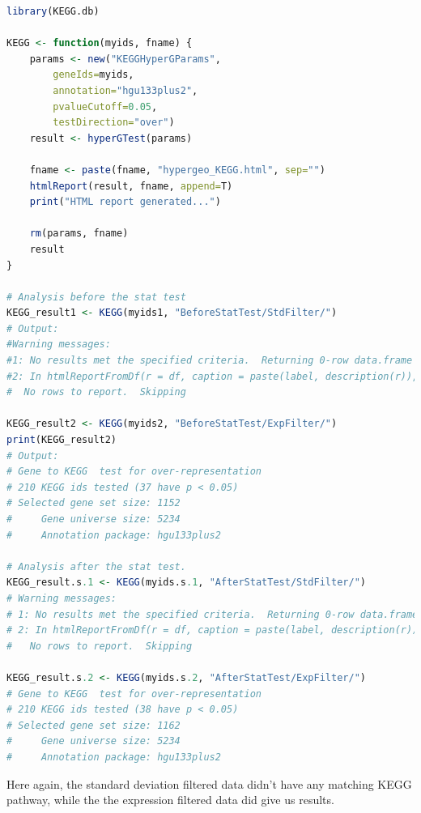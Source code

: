 \documentclass[oneside, a4paper, 11pt]{book}
\begin{document}
\begin{lstlisting}[language=R, caption=Gene Set Enrichment Analysis - KEGG pathways]
library(KEGG.db)

KEGG <- function(myids, fname) {
    params <- new("KEGGHyperGParams",
        geneIds=myids,
        annotation="hgu133plus2",
        pvalueCutoff=0.05,
        testDirection="over")
    result <- hyperGTest(params)

    fname <- paste(fname, "hypergeo_KEGG.html", sep="")
    htmlReport(result, fname, append=T)
    print("HTML report generated...")

    rm(params, fname)
    result
}

# Analysis before the stat test
KEGG_result1 <- KEGG(myids1, "BeforeStatTest/StdFilter/")
# Output:
#Warning messages:
#1: No results met the specified criteria.  Returning 0-row data.frame 
#2: In htmlReportFromDf(r = df, caption = paste(label, description(r)),  :
#  No rows to report.  Skipping

KEGG_result2 <- KEGG(myids2, "BeforeStatTest/ExpFilter/")
print(KEGG_result2)
# Output:
# Gene to KEGG  test for over-representation 
# 210 KEGG ids tested (37 have p < 0.05)
# Selected gene set size: 1152 
#     Gene universe size: 5234 
#     Annotation package: hgu133plus2

# Analysis after the stat test.
KEGG_result.s.1 <- KEGG(myids.s.1, "AfterStatTest/StdFilter/")
# Warning messages:
# 1: No results met the specified criteria.  Returning 0-row data.frame 
# 2: In htmlReportFromDf(r = df, caption = paste(label, description(r)),  :
#   No rows to report.  Skipping

KEGG_result.s.2 <- KEGG(myids.s.2, "AfterStatTest/ExpFilter/")
# Gene to KEGG  test for over-representation 
# 210 KEGG ids tested (38 have p < 0.05)
# Selected gene set size: 1162 
#     Gene universe size: 5234 
#     Annotation package: hgu133plus2
\end{lstlisting}

Here again, the standard deviation filtered data didn't have any matching KEGG pathway, while the the expression filtered data did give us results.

\end{document}
